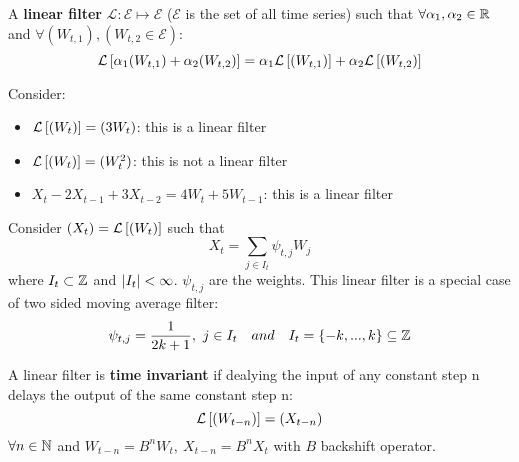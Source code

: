 \begin{definition}
    A \textbf{linear filter} $\mathcal{L}:\mathcal{E}\mapsto\mathcal{E}$ ($\mathcal{E}$ is the set of all time series) such that $\forall \alpha_1,\alpha_2\in\mathbb{R}$ and $\forall(W_{t,1}),(W_{t,2}\in\mathcal{E})$:
    \[
        \mathcal{L}\left[\alpha_1(W_{t,1})+ \alpha_2(W_{t,2})\right]=\alpha_1\mathcal{L}\left[(W_{t,1})\right]+\alpha_2\mathcal{L}\left[(W_{t,2})\right]  
    \]
\end{definition}

\begin{example}
    Consider:
    \begin{itemize}
        \item $\mathcal{L}\left[(W_t)\right]=(3W_t)$: this is a linear filter
        \item $\mathcal{L}\left[(W_t)\right]=(W_t^2)$: this is not a linear filter
        \item $X_t-2X_{t-1}+3X_{t-2}=4W_t+5W_{t-1}$: this is a linear filter
    \end{itemize}
\end{example}

\begin{example}
    Consider $(X_t)=\mathcal{L}\left[(W_t)\right]$ such that
    \[
        X_t=\sum_{j\in I_t}\psi_{t,j}W_j  
    \]
    where $I_t\subset\mathbb{Z}$ and $\left|I_t\right|<\infty$. $\psi_{t,j}$ are the weights. This linear filter is a special case of two sided moving average filter:
    \[
        \psi_{t,j}=\frac{1}{2k+1},\ j\in I_t\ \ \ and\ \ \ I_t=\set{-k,...,k}\subseteq\Z
    \]  
\end{example}

\begin{definition}
    A linear filter is \textbf{time invariant} if dealying the input of any constant step n delays the output of the same constant step n:
    \[
        \mathcal{L}\left[(W_{t-n})\right]=(X_{t-n})  
    \]
    $\forall n\in\mathbb{N}$ and $W_{t-n}=B^nW_t,\ X_{t-n}=B^nX_t$ with $B$ backshift operator.
\end{definition}

